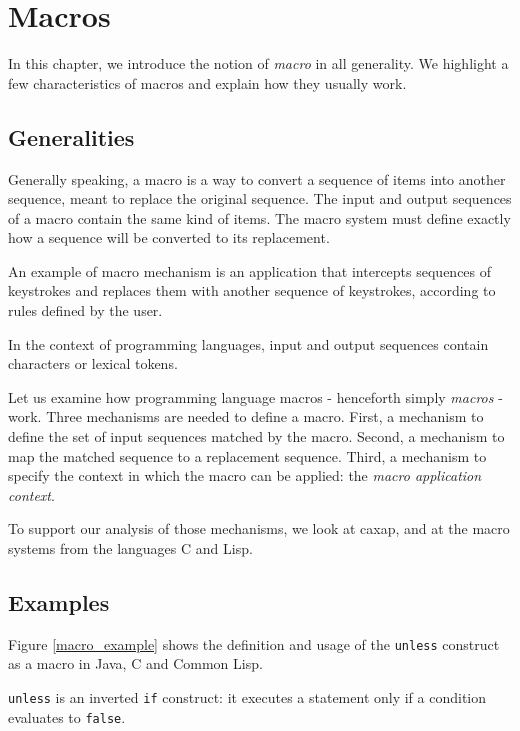 \chapter{Macros}
\label{intro_macros}

In this chapter, we introduce the notion of \emph{macro} in all generality. We
highlight a few characteristics of macros and explain how they usually work.

\section{Generalities}

Generally speaking, a macro is a way to convert a sequence of items into another
sequence, meant to replace the original sequence. The input and output sequences
of a macro contain the same kind of items. The macro system must define exactly
how a sequence will be converted to its replacement.

An example of macro mechanism is an application that intercepts sequences of
keystrokes and replaces them with another sequence of keystrokes, according to
rules defined by the user.

In the context of programming languages, input and output sequences contain
characters or lexical tokens.

Let us examine how programming language macros - henceforth simply \emph{macros}
- work. Three mechanisms are needed to define a macro. First, a mechanism to
define the set of input sequences matched by the macro. Second, a mechanism to
map the matched sequence to a replacement sequence. Third, a mechanism to
specify the context in which the macro can be applied: the \emph{macro
  application context}.

To support our analysis of those mechanisms, we look at caxap, and at the macro
systems from the languages C and Lisp.

\section{Examples}

Figure \ref{macro_example} shows the definition and usage of the \texttt{unless}
construct as a macro in Java, C and Common Lisp.

\texttt{unless} is an inverted \texttt{if} construct: it executes a statement
only if a condition evaluates to \texttt{false}.

